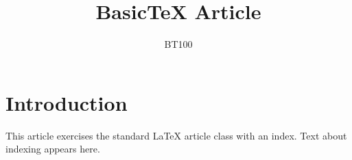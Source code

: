 \documentclass{article}
\begin{document}
\title{BasicTeX Article}\author{BT100}\maketitle
\section{Introduction}
This article exercises the standard LaTeX article class with an index.
Text about indexing appears here.
\printindex
\end{document}
